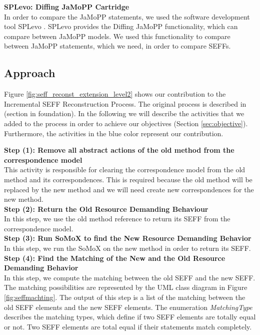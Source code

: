 \textbf{SPLevo: Diffing JaMoPP Cartridge}\\
In order to compare the JaMoPP statements, we used the software development tool SPLevo \cite{klatt2016consolidation}. SPLevo provides the Diffing JaMoPP functionality, which can compare between JaMoPP models. We used this functionality to compare between JaMoPP statements, which we need, in order to compare SEFFs.

\subsection{Approach}
\label{sec:approach}
Figure \ref{fig:seff_reconst_extension_level2} shows our contribution to the Incremental SEFF Reconstruction Process. The original process is described in (section in foundation). In the following we will describe the activities that we added to the process in order to achieve our objectives (Section \ref{sec:objective}). Furthermore, the activities in the blue color represent our contribution.

\textbf{Step (1): Remove all abstract actions of the old method from the correspondence model}\\
This activity is responsible for clearing the correspondence model from the old method and its correspondences. This is required because the old method will be replaced by the new method and we will need create new correspondences for the new method.\\

\textbf{Step (2): Return the Old Resource Demanding Behaviour}\\
In this step, we use the old method reference to return its SEFF from the correspondence model.\\

\textbf{Step (3): Run SoMoX to find the New Resource Demanding Behavior}\\
In this step, we run the SoMoX on the new method in order to return its SEFF. \\

\textbf{Step (4): Find the Matching of the New and the Old Resource Demanding Behavior}\\
In this step, we compute the matching between the old SEFF and the new SEFF. The matching possibilities are represented by the UML class diagram in Figure \ref{fig:seffmachting}.  The output of this step is a list of the matching between the old SEFF elements and the new SEFF elements. The enumeration \textit{MatchingType} describes the matching types, which define if two SEFF elements are totally equal or not. Two SEFF elements are total equal if their statements match completely. \\

